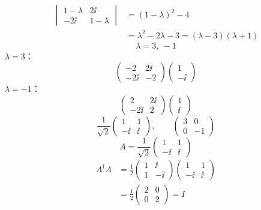 \mikai
{}
\begin{align*}
  \begin{vmatrix}1-\lambda&2\ii\\-2\ii&1-\lambda\end{vmatrix}&=(1-\lambda)^{2}-4\\
  &=\lambda^{2}-2\lambda-3=(\lambda-3)(\lambda+1)
\end{align*}
\[ \lambda=3,\ -1 \]
$\lambda=3$：
\[ \begin{pmatrix}-2&2\ii\\-2\ii&-2\end{pmatrix}\begin{pmatrix}1\\-\ii\end{pmatrix} \]
$\lambda=-1$：
\[ \begin{pmatrix}2&2\ii\\-2\ii&2\end{pmatrix}\begin{pmatrix}1\\\ii\end{pmatrix} \]
\[
  \frac{1}{\sqrt{2}}\begin{pmatrix}1&1\\-\ii&\ii\end{pmatrix},\qquad \begin{pmatrix}3&0\\0&-1\end{pmatrix}
\]
\[
  A=\frac{1}{\sqrt{2}}\begin{pmatrix}1&1\\-\ii&\ii\end{pmatrix}
\]
\begin{align*}
  A^{\dagger}A&=\frac{1}{2}\begin{pmatrix}1&\ii\\1&-\ii\end{pmatrix}\begin{pmatrix}1&1\\-\ii&\ii\end{pmatrix}\\
  &=\frac{1}{2}\begin{pmatrix}2&0\\0&2\end{pmatrix}=I
\end{align*}
